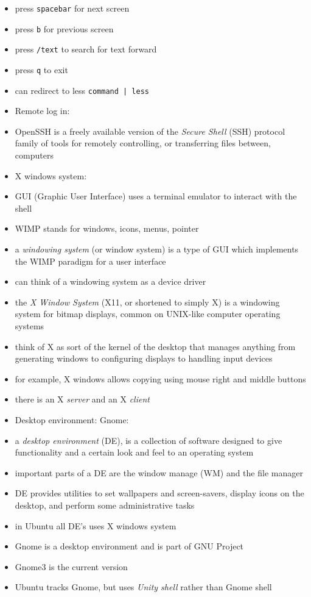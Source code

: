 \documentclass[twocolumn]{IEEEtran} %
\begin{document}
\begin{itemize}
            \item press \verb|spacebar| for next screen
            \item press \verb|b| for previous screen
            \item press \verb|/text| to search for text forward
            \item press \verb|q| to exit
            \item can redirect to less \verb!command | less!
        \ei
    \ei
    \item Remote log in:
    \bi
        \item OpenSSH is a freely available version of the \emph{Secure Shell} (SSH) protocol family of tools for remotely controlling, or transferring files between, computers
    \ei
    \item X windows system:
	\bi
         \item GUI (Graphic User Interface) uses a terminal emulator to interact with the shell
         \item WIMP stands for windows, icons, menus, pointer
         \item a \emph{windowing system} (or window system) is a type of GUI which implements the WIMP paradigm for a user interface
         \bi
            \item can think of a windowing system as a device driver
         \ei
		 \item the \emph{X Window System} (X11, or shortened to simply X) is a windowing system for bitmap displays, common on UNIX-like computer operating systems
        \item think of X as sort of the kernel of the desktop that manages anything from generating windows to configuring displays to handling input devices
        \bi
            \item for example, X windows allows copying using mouse right and middle buttons
        \ei
        \item there is an X \emph{server} and an X \emph{client}
	\ei
    \item Desktop environment: Gnome:
    \bi
        \item a \emph{desktop environment} (DE), is a collection of software designed to give functionality and a certain look and feel to an operating system
        \bi
            \item important parts of a DE are the window manage (WM) and the file manager
            \item DE provides utilities to set wallpapers and screen-savers, display icons on the desktop, and perform some administrative tasks
            \item in Ubuntu all DE's uses X windows system
        \ei
	    \item Gnome is a desktop environment and is part of GNU Project
        \bi
            \item Gnome3 is the current version
        \ei
        \item Ubuntu tracks Gnome, but uses \emph{Unity shell} rather than Gnome shell
    \ei
\end{itemize}
\end{document}
